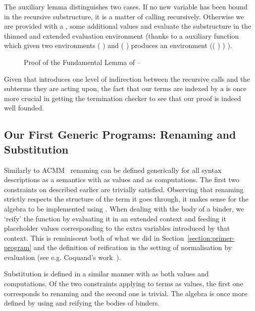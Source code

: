 The auxiliary lemma  distinguishes two cases. If no new
variable has been bound in the recursive substructure, it is
a matter of calling \semfun{} recursively. Otherwise we are provided
with a , some additional values and evaluate the
substructure in the thinned and extended evaluation environment
(thanks to a auxiliary function \AF{\_>>\_} which given two environments
{( )  } and {( )  }
produces an environment {(( \AF{++} ) )  )}.

\begin{figure}[h]
\caption{Proof of the Fundamental Lemma of \semrec{} -- }\label{def:body}
\end{figure}

Given that  introduces one level of indirection between the
recursive calls and the subterms they are acting upon, the fact
that our terms are indexed by a  is once more crucial in
getting the termination checker to see that our proof is indeed
well founded.

\subsection{Our First Generic Programs: Renaming and Substitution}\label{section:renandsub}

Similarly to ACMM~\citeyear{allais2017type} renaming can be defined generically
for all syntax descriptions as a semantics with  as values and  as
computations. The first two constraints on  described earlier are trivially
satisfied. Observing that renaming strictly respects the structure of the term it
goes through, it makes sense for the algebra to be implemented using .
When dealing with the body of a binder, we `reify' the  function by
evaluating it in an extended context and feeding it placeholder values corresponding to
the extra variables introduced by that context. This is reminiscent both of what we
did in Section~\ref{section:primer-program} and the definition of reification in
the setting of normalisation by evaluation (see e.g. Coquand's work~\citeyear{coquand2002formalised}).

Substitution is defined in a similar manner with  as both
values and computations. Of the two constraints applying to terms as
values, the first one corresponds to renaming and the second
one is trivial. The algebra is once more defined by using 
and reifying the bodies of binders.

